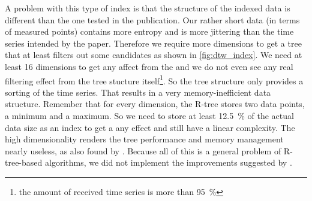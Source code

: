 A problem with this type of index is that the structure of the indexed data is different than the one tested in the publication. Our rather short data (in terms of measured points) contains more entropy and is more jittering than the time series intended by the paper. Therefore we require more dimensions to get a tree that at least filters out some candidates as shown in \autoref{fig:dtw_index}. We need at least \num{16} dimensions to get any affect from the  and we do not even see any real filtering effect from the tree stucture itself\footnote{the amount of received time series is more than \SI{95}{\percent}}. So the tree structure only provides a sorting of the time series. That results in a very memory-inefficient data structure. Remember that for every dimension, the R-tree stores two data points, a minimum and a maximum. So we need to store at least \SI{12.5}{\percent} of the actual data size as an index to get a any effect and still have a linear complexity. The high dimensionality renders the tree performance and memory management nearly useless, as also found by \cite{rtree_highdim}. Because all of this is a general problem of R-tree-based algorithms, we did not implement the improvements suggested by \cite{LB_Improved}.
